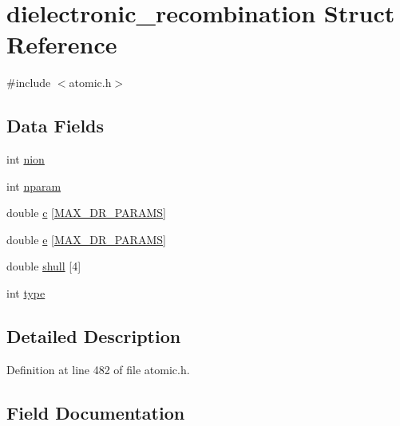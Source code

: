 \hypertarget{structdielectronic__recombination}{}\section{dielectronic\+\_\+recombination Struct Reference}
\label{structdielectronic__recombination}


{\ttfamily \#include $<$atomic.\+h$>$}

\subsection*{Data Fields}
\begin{DoxyCompactItemize}
\item 
int \hyperlink{structdielectronic__recombination_a351ef41ceb8062b2f1baaa62be666b82}{nion}
\item 
int \hyperlink{structdielectronic__recombination_a9185ca489b0c4a12f099d92398579b4a}{nparam}
\item 
double \hyperlink{structdielectronic__recombination_a929bac0d536254e573f1d38ebe4ad437}{c} \mbox{[}\hyperlink{atomic_8h_ab598970a8cc3becf4b00fc98946de0c0}{M\+A\+X\+\_\+\+D\+R\+\_\+\+P\+A\+R\+A\+MS}\mbox{]}
\item 
double \hyperlink{structdielectronic__recombination_a15a2ea0615396d1fbba21185c7141cda}{e} \mbox{[}\hyperlink{atomic_8h_ab598970a8cc3becf4b00fc98946de0c0}{M\+A\+X\+\_\+\+D\+R\+\_\+\+P\+A\+R\+A\+MS}\mbox{]}
\item 
double \hyperlink{structdielectronic__recombination_a5dfa371f0eee66a4816ad6b1b3768153}{shull} \mbox{[}4\mbox{]}
\item 
int \hyperlink{structdielectronic__recombination_a69ec8ee001dbdce4ffdd7a17a6ae8720}{type}
\end{DoxyCompactItemize}


\subsection{Detailed Description}


Definition at line 482 of file atomic.\+h.



\subsection{Field Documentation}
\mbox{\label{structdielectronic__recombination_a929bac0d536254e573f1d38ebe4ad437}} 
